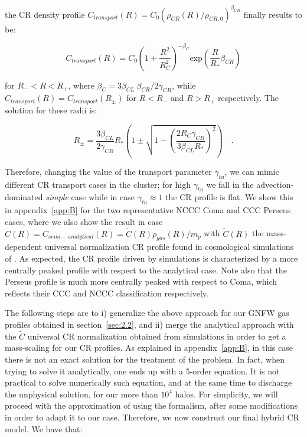 \documentclass[traditabstract]{aa}
\newcommand{\rmn}{\mathrm}
\begin{document}
the CR density profile $C_{transport}(R)=C_{0}(\rho_{CR}(R)/\rho_{CR,0})^{\beta_{CR}}$ finally results to be:

\begin{equation}
C_{transport}(R) = C_{0}\left( 1+ \frac{R^{2}}{R_{C}^{2}} \right)^{-\beta_{C}} \rmn{exp}\left( {\frac{R}{R_{*}}\beta_{CR}} \right)
\label{eq:Ctransport}
\end{equation} 

for $R_{-}<R<R_{+}$, where $\beta_{C}=3\beta_{CL}~\beta_{CR}/2\gamma_{CR}$, while $C_{transport}(R) = C_{transport}(R_{\pm})$ for $R<R_{-}$ and $R>R_{+}$ respectively. The solution for these radii is:

\begin{equation}
R_{\pm} = \frac{3\beta_{CL}}{2\gamma_{CR}}R_{*}\left(1\pm\sqrt{1-\left(\frac{2R_{C}\gamma_{CR}}{3\beta_{CL}R_{*}}\right)^{2}}\right) \quad .
\label{eq:Rpm}
\end{equation} 

Therefore, changing the value of the transport parameter $\gamma_{tu}$, we can mimic different CR transport cases in the cluster; for high $\gamma_{tu}$ we fall in the advection-dominated \emph{simple} case while in case $\gamma_{tu}\approx1$ the CR profile is flat. We show this in appendix~\ref{app:B} for the two representative NCCC Coma and CCC Perseus cases, where we also show the result in case $C(R)=C_{semi-analytical}(R)=\tilde{C}(R)\rho_{gas}(R)/m_{p}$ with $\tilde{C}(R)$ the mass-dependent universal normalization CR profile found in cosmological simulations of \cite{2010MNRAS.409..449P}. As expected, the CR profile driven by simulations is characterized by a more centrally peaked profile with respect to the analytical case. Note also that the Perseus profile is much more centrally peaked with respect to Coma, which reflects their CCC and NCCC classification respectively.

The following steps are to i) generalize  the above approach for our GNFW gas profiles obtained in section~\ref{sec:2.2}, and ii) merge the \cite{2011A&A...527A..99E} analytical approach with the $\tilde{C}$ universal CR normalization obtained from simulations in order to get a mass-scaling for our CR profiles. As explained in appendix~\ref{app:B}, in this case there is not an exact solution for the \cite{2011A&A...527A..99E} treatment of the problem. In fact, when trying to solve it analytically, one ends up with a 5-order equation. It is not practical to solve numerically such equation, and at the same time to discharge the unphysical solution, for our more than $10^4$ halos. For simplicity, we will proceed with the approximation of using the \cite{2011A&A...527A..99E} formalism, after some modifications in order to adapt it to our case. Therefore, we now construct our final hybrid CR model. We have that:
\end{document}

